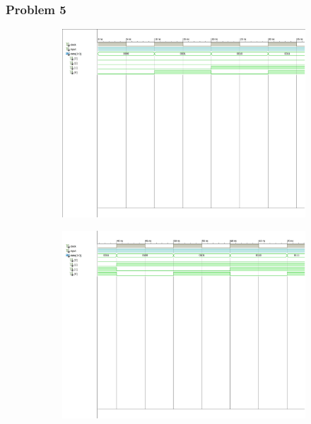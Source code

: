 \documentclass{lab_sheet}
\begin{document}
    \subsubsection*{Problem 5}
    \begin{figure}[H]
        \centering
        \begin{subfigure}{\linewidth}
            \includegraphics[width=.95\linewidth,  frame]{../Figures/5-1.pdf}
        \caption{}
        \label{fig:obs5-1}
        \end{subfigure}
        \begin{subfigure}{\linewidth}
            \includegraphics[width=.95\linewidth,  frame]{../Figures/5-2.pdf}
        \caption{}
        \label{fig:obs5-2}
        \end{subfigure}

\end{figure}
\end{document}
